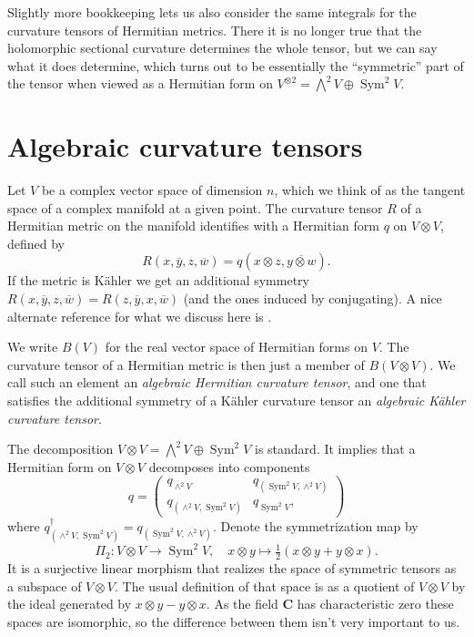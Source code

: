 \documentclass[10pt,a4paper]{amsart}
\theoremstyle{definition}
\def\ov#1{\overline{#1}}
\def\CC{\mathbf{C}}
\DeclareMathOperator{\Sym}{Sym}
\begin{document}
Slightly more bookkeeping lets us also consider the same integrals for the curvature tensors of Hermitian metrics.
There it is no longer true that the holomorphic sectional curvature determines the whole tensor, but we can say what it does determine, which turns out to be essentially the ``symmetric'' part of the tensor when viewed as a Hermitian form on $V^{\otimes 2} = \bigwedge^{2} V \oplus \Sym^2 V$.

\section{Algebraic curvature tensors}

Let $V$ be a complex vector space of dimension $n$, which we think of as the
tangent space of a complex manifold at a given point.
The curvature tensor $R$ of a Hermitian metric on the manifold identifies with
a Hermitian form $q$ on $V \otimes V$, defined by
$$
R(x, \ov y, z, \ov w)
= q(x \otimes z, \ov{y \otimes w}).
$$
If the metric is K\"ahler we get an additional symmetry
$R(x, \ov y, z, \ov w) = R(z, \ov y, x, \ov w)$
(and the ones induced by conjugating).
A nice alternate reference for what we discuss here is
\cite{algebraic-kahler-curvature}.

We write $B(V)$ for the real vector space of Hermitian forms on $V$.
The curvature tensor of a Hermitian metric is then just a member of $B(V
\otimes V)$. We call such an element an \emph{algebraic Hermitian curvature
tensor}, and one that satisfies the additional symmetry of a K\"ahler curvature
tensor an \emph{algebraic K\"ahler curvature tensor}.

The decomposition $V \otimes V = \bigwedge^2 V \oplus \Sym^2 V$ is standard.
It implies that a Hermitian form on $V \otimes V$ decomposes into components
$$
q = \begin{pmatrix}
q_{\wedge^2 V} & q_{(\Sym^2V, \wedge^2 V)}
\\
q_{(\wedge^2 V, \Sym^2V)} & q_{\Sym^2 V},
\end{pmatrix}
$$
where $q_{(\wedge^2 V, \Sym^2V)}^\dagger = q_{(\Sym^2V, \wedge^2 V)}$.
Denote the symmetrization map by
$$
\Pi_2 : V \otimes V \to \Sym^2 V,
\quad
x \otimes y \mapsto \tfrac 12 (x \otimes y + y \otimes x).
$$
It is a surjective linear morphism that realizes the space of symmetric tensors
as a subspace of $V \otimes V$.
The usual definition of that space is as a quotient of $V \otimes V$ by the
ideal generated by $x \otimes y - y \otimes x$.
As the field $\CC$ has characteristic zero these spaces are isomorphic,
so the difference between them isn't very important to us.
\end{document}
